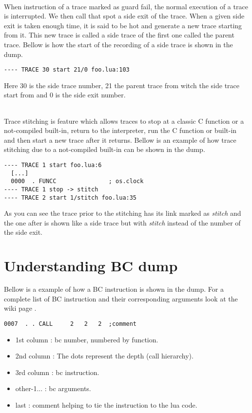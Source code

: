 \\
When instruction of a trace marked as guard fail, the normal execution of a
trace is interrupted. We then call that spot a side exit of the trace. When a
given side exit is taken enough time, it is said to be hot and generate a new
trace starting from it. This new trace is called a side trace of the first one
called the parent trace. Bellow is how the start of the recording of a side
trace is shown in the dump.
\begin{verbatim}
---- TRACE 30 start 21/0 foo.lua:103
\end{verbatim}
Here 30 is the side trace number, 21 the parent trace from witch the side trace
start from and 0 is the side exit number.

\\
Trace stitching is feature which allows traces to stop at a classic C function
or a not-compiled built-in, return to the interpreter, run the C function or
built-in and then start a new trace after it returns. Bellow is an example of
how trace stitching due to a not-compiled built-in can be shown in the dump.
\begin{verbatim}
---- TRACE 1 start foo.lua:6
  [...]
  0000  . FUNCC               ; os.clock
---- TRACE 1 stop -> stitch
---- TRACE 2 start 1/stitch foo.lua:35
\end{verbatim}
As you can see the trace prior to the stitching has its link marked as
\emph{stitch} and the one after is shown like a side trace but with
\emph{stitch} instead of the number of the side exit.

\section{Understanding BC dump}
\label{Sec:dump-bc}
Bellow is a example of how a BC instruction is shown in the dump. For a complete
list of BC instruction and their corresponding arguments look at the wiki page
\cite{luajit-bc}.
\begin{verbatim}
0007  . . CALL     2   2   2  ;comment
\end{verbatim}
\begin{itemize}
  \item 1st column : bc number, numbered by function.
  \item 2nd column : The dots represent the depth (call hierarchy).
  \item 3rd column : bc instruction.
  \item other-1... : bc arguments.
  \item last       : comment helping to tie the instruction to the lua code.
\end{itemize}

